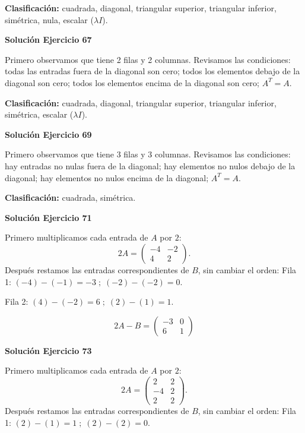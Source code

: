 \documentclass[12pt]{article}
\theoremstyle{remark}
\begin{document}
\textbf{Clasificación:} cuadrada, diagonal, triangular superior, triangular inferior, simétrica, nula, escalar ($\lambda I$).


\par\bigskip\noindent\textbf{Solución Ejercicio 67}\par\nobreak
Primero observamos que tiene 2 filas y 2 columnas. Revisamos las condiciones: todas las entradas fuera de la diagonal son cero; todos los elementos debajo de la diagonal son cero; todos los elementos encima de la diagonal son cero; $A^T=A$.

\textbf{Clasificación:} cuadrada, diagonal, triangular superior, triangular inferior, simétrica, escalar ($\lambda I$).


\par\bigskip\noindent\textbf{Solución Ejercicio 69}\par\nobreak
Primero observamos que tiene 3 filas y 3 columnas. Revisamos las condiciones: hay entradas no nulas fuera de la diagonal; hay elementos no nulos debajo de la diagonal; hay elementos no nulos encima de la diagonal; $A^T=A$.

\textbf{Clasificación:} cuadrada, simétrica.


\par\bigskip\noindent\textbf{Solución Ejercicio 71}\par\nobreak
Primero multiplicamos cada entrada de $A$ por $2$:
\[
2A=\begin{pmatrix}-4&-2\\4&2\end{pmatrix}.
\]
Después restamos las entradas correspondientes de $B$, sin cambiar el orden:
Fila 1: $(-4)-(-1)=-3\; ;\; (-2)-(-2)=0$.

Fila 2: $(4)-(-2)=6\; ;\; (2)-(1)=1$.

\[
\boxed{2A-B=\begin{pmatrix}-3&0\\6&1\end{pmatrix}}
\]

\par\bigskip\noindent\textbf{Solución Ejercicio 73}\par\nobreak
Primero multiplicamos cada entrada de $A$ por $2$:
\[
2A=\begin{pmatrix}2&2\\-4&2\\2&2\end{pmatrix}.
\]
Después restamos las entradas correspondientes de $B$, sin cambiar el orden:
Fila 1: $(2)-(1)=1\; ;\; (2)-(2)=0$.
\end{document}
